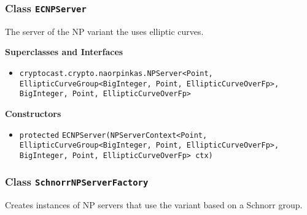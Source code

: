 \subsubsection{Class \lstinline|ECNPServer|}
The server of the NP variant the uses elliptic curves. \\
\noindent\begin{minipage}[t]{5cm}
\vspace{0.3em}
\hspace*{2em}
\vspace{0.3em}
\end{minipage}



\textbf{\sffamily Superclasses and Interfaces}
\begin{itemize}
\item \lstinline|cryptocast.crypto.naorpinkas.NPServer<Point, EllipticCurveGroup<BigInteger, Point, EllipticCurveOverFp>, BigInteger, Point, EllipticCurveOverFp>|
\end{itemize}


\textbf{\sffamily Constructors}
\begin{itemize}
\item \lstinline|protected| \lstinline|ECNPServer|\lstinline|(NPServerContext<Point, EllipticCurveGroup<BigInteger, Point, EllipticCurveOverFp>, BigInteger, Point, EllipticCurveOverFp> ctx)| \\[-0.6em]




\end{itemize}


\subsubsection{Class \lstinline|SchnorrNPServerFactory|}
Creates instances of NP servers that use the variant based on a Schnorr
 group. \\
\noindent\begin{minipage}[t]{5cm}
\vspace{0.3em}
\hspace*{2em}
\vspace{0.3em}
\end{minipage}



